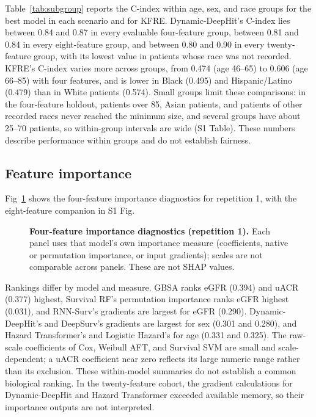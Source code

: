 \documentclass[10pt,letterpaper]{article}
\begin{document}
Table~\ref{tab:subgroup} reports the C-index within age, sex, and race groups for the best model in each scenario and for KFRE. Dynamic-DeepHit's C-index lies between 0.84 and 0.87 in every evaluable four-feature group, between 0.81 and 0.84 in every eight-feature group, and between 0.80 and 0.90 in every twenty-feature group, with its lowest value in patients whose race was not recorded. KFRE's C-index varies more across groups, from 0.474 (age 46--65) to 0.606 (age 66--85) with four features, and is lower in Black (0.495) and Hispanic/Latino (0.479) than in White patients (0.574). Small groups limit these comparisons: in the four-feature holdout, patients over 85, Asian patients, and patients of other recorded races never reached the minimum size, and several groups have about 25--70 patients, so within-group intervals are wide (S1 Table). These numbers describe performance within groups and do not establish fairness.

\subsection*{Feature importance}

Fig~\ref{fig:feature_importance_four} shows the four-feature importance diagnostics for repetition 1, with the eight-feature companion in S1 Fig.

\begin{figure}[h!]
    \centering
    \caption{{\bf Four-feature importance diagnostics (repetition 1).} Each panel uses that model's own importance measure (coefficients, native or permutation importance, or input gradients); scales are not comparable across panels. These are not SHAP values.}
    \label{fig:feature_importance_four}
\end{figure}

Rankings differ by model and measure. GBSA ranks eGFR (0.394) and uACR (0.377) highest, Survival RF's permutation importance ranks eGFR highest (0.031), and RNN-Surv's gradients are largest for eGFR (0.290). Dynamic-DeepHit's and DeepSurv's gradients are largest for sex (0.301 and 0.280), and Hazard Transformer's and Logistic Hazard's for age (0.331 and 0.325). The raw-scale coefficients of Cox, Weibull AFT, and Survival SVM are small and scale-dependent; a uACR coefficient near zero reflects its large numeric range rather than its exclusion. These within-model summaries do not establish a common biological ranking. In the twenty-feature cohort, the gradient calculations for Dynamic-DeepHit and Hazard Transformer exceeded available memory, so their importance outputs are not interpreted.
\end{document}
